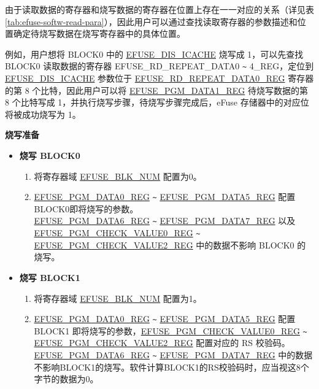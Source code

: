 \documentclass[main\_\_CN.tex]{subfiles}
\begin{document}
由于读取数据的寄存器和烧写数据的寄存器在位置上存在一一对应的关系（详见表 \ref{tab:efuse-softw-read-para}），因此用户可以通过查找读取寄存器的参数描述和位置确定待烧写数据在烧写寄存器中的具体位置。

例如，用户想将 BLOCK0 中的 \hyperref[fielddesc:EFUSEDISICACHE]{EFUSE\_DIS\_ICACHE} 烧写成 1，可以先查找 BLOCK0 读取数据的寄存器 EFUSE\_RD\_REPEAT\_DATA0 \verb+~+ 4\_REG，定位到 \hyperref[fielddesc:EFUSEDISICACHE]{EFUSE\_DIS\_ICACHE} 参数位于 \hyperref[regdesc:EFUSERDREPEATDATA0REG]{EFUSE\_RD\_REPEAT\_DATA0\_REG} 寄存器的第 8 个比特，因此用户可以将 \hyperref[regdesc:EFUSEPGMDATA1REG]{EFUSE\_PGM\_DATA1\_REG} 待烧写数据的第 8 个比特写成 1，并执行烧写步骤，待烧写步骤完成后，eFuse 存储器中的对应位将被成功烧写为 1。

{\bfseries 烧写准备}

\begin{itemize}
    \item {\bfseries 烧写 BLOCK0}
    \begin{enumerate}
        \item 将寄存器域 \hyperref[fielddesc:EFUSEBLKNUM]{EFUSE\_BLK\_NUM} 配置为0。
        \item \hyperref[regdesc:EFUSEPGMDATA0REG]{EFUSE\_PGM\_DATA0\_REG} \verb+~+ \hyperref[regdesc:EFUSEPGMDATA1REG]{EFUSE\_PGM\_DATA5\_REG} 配置BLOCK0即将烧写的参数。\\
        \hyperref[regdesc:EFUSEPGMDATA6REG]{EFUSE\_PGM\_DATA6\_REG} \verb+~+ \hyperref[regdesc:EFUSEPGMDATA7REG]{EFUSE\_PGM\_DATA7\_REG} 以及\\ \hyperref[regdesc:EFUSEPGMCHECKVALUE0REG]{EFUSE\_PGM\_CHECK\_VALUE0\_REG} \verb+~+ \hyperref[regdesc:EFUSEPGMCHECKVALUE2REG]{EFUSE\_PGM\_CHECK\_VALUE2\_REG} 中的数据不影响 BLOCK0 的烧写。
    \end{enumerate}
    \item {\bfseries 烧写 BLOCK1}
    \begin{enumerate}
        \item 将寄存器域 \hyperref[fielddesc:EFUSEBLKNUM]{EFUSE\_BLK\_NUM} 配置为1。
        \item \hyperref[regdesc:EFUSEPGMDATA0REG]{EFUSE\_PGM\_DATA0\_REG} \verb+~+ \hyperref[regdesc:EFUSEPGMDATA5REG]{EFUSE\_PGM\_DATA5\_REG} 配置 BLOCK1 即将烧写的参数，\hyperref[regdesc:EFUSEPGMCHECKVALUE0REG]{EFUSE\_PGM\_CHECK\_VALUE0\_REG} \verb+~+ \hyperref[regdesc:EFUSEPGMCHECKVALUE2REG]{EFUSE\_PGM\_CHECK\_VALUE2\_REG} 配置对应的 RS 校验码。\\
        \hyperref[regdesc:EFUSEPGMDATA0REG]{EFUSE\_PGM\_DATA6\_REG} \verb+~+ \hyperref[regdesc:EFUSEPGMDATA5REG]{EFUSE\_PGM\_DATA7\_REG} 中的数据不影响BLOCK1的烧写。软件计算BLOCK1的RS校验码时，应当视这8个字节的数据为0。

\end{enumerate}
\end{itemize}
\end{document}
